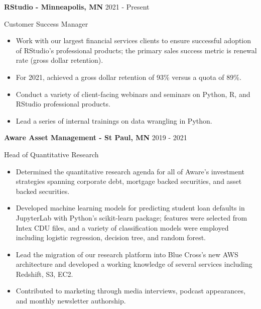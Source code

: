 \documentclass[11pt,a4paper,]{awesome-cv}
\begin{document}
\textbf{RStudio - Minneapolis, MN} \hfill 2021 - Present

\vspace{-1ex}

Customer Success Manager

\vspace{-1.5ex}

\small

\begin{itemize}
\item
  Work with our largest financial services clients to ensure successful
  adoption of RStudio's professional products; the primary sales success
  metric is renewal rate (gross dollar retention). \vspace{-0.5ex}
\item
  For 2021, achieved a gross dollar retention of 93\% versus a quota of
  89\%. \vspace{-0.5ex}
\item
  Conduct a variety of client-facing webinars and seminars on Python, R,
  and RStudio professional products. \vspace{-0.5ex}
\item
  Lead a series of internal trainings on data wrangling in Python.
  \vspace{-0.5ex}
\end{itemize}

\normalsize

\textbf{Aware Asset Management - St Paul, MN} \hfill 2019 - 2021

\vspace{-1ex}

Head of Quantitative Research

\vspace{-1.5ex}

\small

\begin{itemize}
\item
  Determined the quantitative research agenda for all of Aware's
  investment strategies spanning corporate debt, mortgage backed
  securities, and asset backed securities. \vspace{-0.5ex}
\item
  Developed machine learning models for predicting student loan defaults
  in JupyterLab with Python's scikit-learn package; features were
  selected from Intex CDU files, and a variety of classification models
  were employed including logistic regression, decision tree, and random
  forest. \vspace{-0.5ex}
\item
  Lead the migration of our research platform into Blue Cross's new AWS
  architecture and developed a working knowledge of several services
  including Redshift, S3, EC2. \vspace{-0.5ex}
\item
  Contributed to marketing through media interviews, podcast
  appearances, and monthly newsletter authorship. \vspace{-0.5ex}
\end{itemize}
\end{document}
